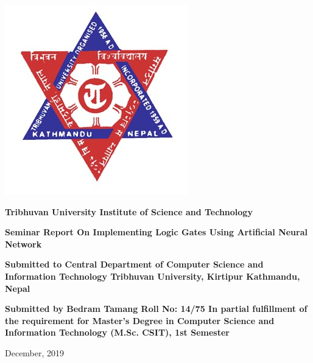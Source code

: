 
\begin{center}
\includegraphics[scale=0.5]{resources/logo.jpg}
\end{center}

\begin{center}
\textbf{
Tribhuvan University
\linebreak
Institute of Science and Technology 
}
\end{center}


\begin{center}
\vspace{1.5cm}
\textbf{
Seminar Report 
\linebreak
On
\linebreak
Implementing Logic Gates Using Artificial Neural Network
}
\end{center}

\begin{center}
\vspace{1.5cm}
\textbf{
Submitted to 
\linebreak
Central Department of Computer Science and Information Technology
\linebreak
Tribhuvan University, Kirtipur
Kathmandu, Nepal
}
\end{center}

\begin{center}
\vspace{1.5cm}
\textbf{
Submitted by
\linebreak
Bedram Tamang
\linebreak
Roll No: 14/75
\vspace{1.5cm}
\linebreak
In partial fulfillment of the requirement for Master's Degree in Computer Science and Information Technology (M.Sc. CSIT), 1st Semester
}
\end{center}

\vspace{1cm}
\begin{center}
	December, 2019
\end{center}


\clearpage
